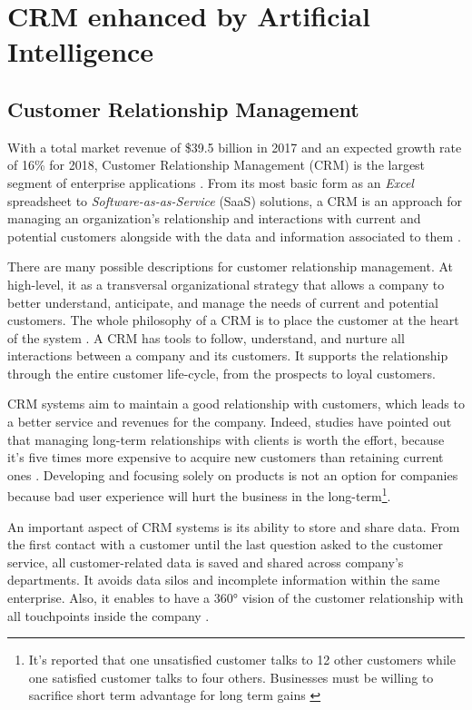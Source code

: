 \chapter{CRM enhanced by Artificial Intelligence}
\label{sec:crm-ai}


\section{Customer Relationship Management}

With a total market revenue of \$39.5 billion in 2017 and an expected growth rate of 16\% for 2018, Customer Relationship Management (CRM) is the largest segment of enterprise applications \cite{gartner-crm-market}. From its most basic form as an \textit{Excel} spreadsheet to \textit{Software-as-as-Service} (SaaS) solutions, a CRM is an approach for managing an organization's relationship and interactions with current and potential customers alongside with the data and information associated to them \cite{salesforce:CRM-def}.

There are many possible descriptions for customer relationship management. At high-level, it as a transversal organizational strategy that allows a company to better understand, anticipate, and manage the needs of current and potential customers. The whole philosophy of a CRM is to place the customer at the heart of the system \cite{brown2000customer}\nocite{biedermann-crm}. A CRM has tools to follow, understand, and nurture all interactions between a company and its customers. It supports the relationship through the entire customer life-cycle, from the prospects to loyal customers. 

CRM systems aim to maintain a good relationship with customers, which leads to a better service and revenues for the company. Indeed, studies have pointed out that managing long-term relationships with clients is worth the effort, because it's five times more expensive to acquire new customers than retaining current ones \cite{crm-facts}. Developing and focusing solely on products is not an option for companies because bad user experience will hurt the business in the long-term\footnote{It's reported that one unsatisfied customer talks to 12 other customers while one satisfied customer talks to four others. Businesses must be willing to sacrifice short term advantage for long term gains \cite{crm-facts,bennet,crm-essay}}.

An important aspect of CRM systems is its ability to store and share data. From the first contact with a customer until the last question asked to the customer service, all customer-related data is saved and shared across company's departments. It avoids data silos and incomplete information within the same enterprise. Also, it enables to have a 360° vision of the customer relationship with all touchpoints inside the company \cite{efficy-crm}.

